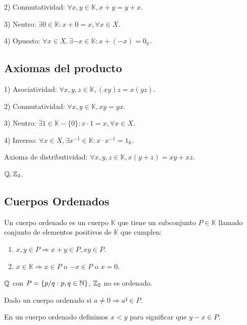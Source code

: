 2) Conmutatividad: \(\forall x,y \in \mathbb{K}, x+y=y+x\).

3) Neutro: \(\exists 0 \in \mathbb{K} :x+0 = x, \forall x \in X\).

4) Opuesto: \(\forall x \in X, \exists -x \in \mathbb{K} : x +(-x) = 0_\mathbb{K}\).

\subsection{Axiomas del producto}

1) Asociatividad: \(\forall x,y,z \in \mathbb{K}, (xy)z=x(yz)\).

2) Conmutatividad: \(\forall x,y \in \mathbb{K}, xy=yx\).

3) Neutro: \(\exists 1 \in \mathbb{K}-\{0\} :x \cdot 1 = x, \forall x \in X\).

4) Inverso: \(\forall x \in X, \exists x^{-1} \in \mathbb{K} : x \cdot x^{-1} = 1_\mathbb{K}\).

Axioma de distributividad: \(\forall x,y,z \in \mathbb{K}, x(y+z)=xy+xz\).

\begin{eg}
    \(\mathbb{Q}, \mathbb{Z}_2\).
\end{eg}

\subsection{Cuerpos Ordenados}

Un cuerpo ordenado es un cuerpo \(\mathbb{K}\) que tiene un subconjunto \(P \in \mathbb{K}\) llamado conjunto de elementos positivos de \(\mathbb{K}\) que cumplen:
\begin{enumerate}
    \item \(x,y \in P \Rightarrow x+y \in P, xy \in P\).
    \item \(x \in \mathbb{K} \Rightarrow x \in P\) o \(-x \in P\) o \(x=0\).
\end{enumerate}

\begin{eg}
    \(\mathbb{Q}\) con \(P = \{ p/q:p,q\in \mathbb{N} \}\), \(\mathbb{Z}_2\) no es ordenado.
\end{eg}

\begin{prop}
    Dado un cuerpo ordenado si \(a \neq 0 \Rightarrow a²\in P\).
\end{prop}

En un cuerpo ordenado definimos \(x<y\) para significar que \(y-x\in P\).

